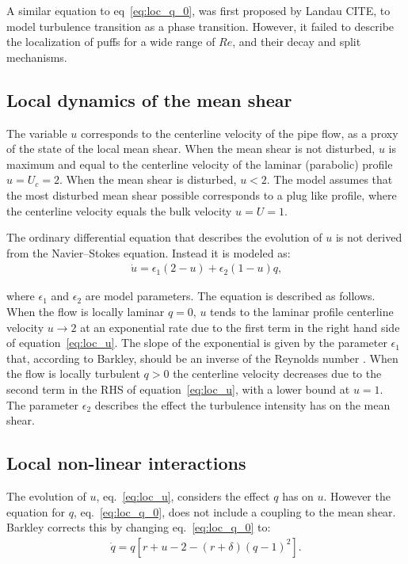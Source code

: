 \documentclass{article}
\begin{document}
A similar equation to eq~\ref{eq:loc_q_0}, was first proposed by Landau CITE, to model turbulence transition as a phase transition. However, it failed to describe the localization of puffs for a wide range of $Re$, and their decay and split mechanisms. 






\subsection{Local dynamics of the mean shear}
The variable $u$ corresponds to the centerline velocity of the pipe flow, as a proxy of the state of the local mean shear. When the mean shear is not disturbed, $u$ is maximum and equal to the centerline velocity of the laminar (parabolic) profile $u=U_{c}=2$. When the mean shear is disturbed, $u<2$. The model assumes that the most disturbed mean shear possible corresponds to a plug like profile, where the centerline velocity equals the bulk velocity $u=U=1$. 

The ordinary differential equation that describes the evolution of $u$ is not derived from the Navier--Stokes equation. Instead it is modeled as:
\begin{align}
\dot{u}= \epsilon_{1} \left(2-u \right) + \epsilon_{2} \left(1-u \right)q \text{,}
\label{eq:loc_u}
\end{align}

where $\epsilon_{1}$ and $\epsilon_{2}$ are model parameters. The equation is described as follows. When the flow is locally laminar $q=0$, $u$ tends to the laminar profile centerline velocity $u \rightarrow 2$ at an exponential rate due to the first term in the right hand side of equation~\ref{eq:loc_u}. The slope of the exponential is given by the parameter $\epsilon_{1}$ that, according to Barkley, should be an inverse of the Reynolds number \cite{barkley2016}. When the flow is locally turbulent $q>0$ the centerline velocity decreases due to the second term in the RHS of equation~\ref{eq:loc_u}, with a lower bound at $u=1$. The parameter $\epsilon_{2}$ describes the effect the turbulence intensity has on the mean shear. 





\subsection{Local non-linear interactions}
The evolution of $u$, eq.~\ref{eq:loc_u}, considers the effect $q$ has on $u$. However the equation for $q$, eq.~\ref{eq:loc_q_0}, does not include a coupling to the mean shear. Barkley corrects this by changing eq.~\ref{eq:loc_q_0} to: 
\begin{align}
\dot{q}=q \left[r+u-2-\left(r+\delta \right) \left(q -1 \right)^{2} \right]\text{.}
\label{eq:loc_q}
\end{align}
\end{document}
